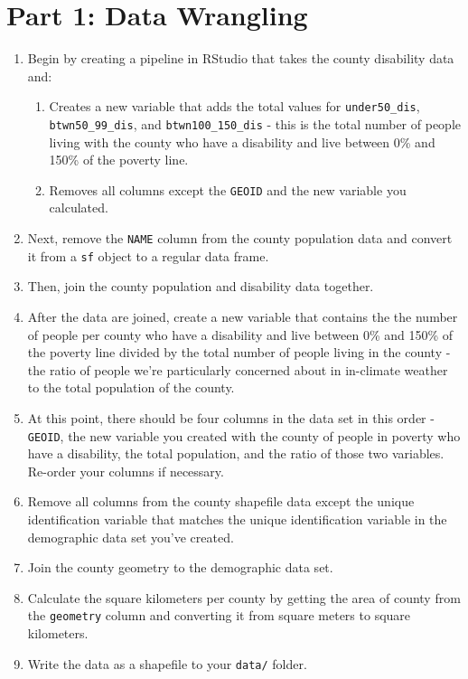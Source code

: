 \documentclass{tufte-handout}
\begin{document}
\section{Part 1: Data Wrangling}
\begin{enumerate}
\item Begin by creating a pipeline in RStudio that takes the county disability data and:
\begin{enumerate}
\item Creates a new variable that adds the total values for \texttt{under50\_dis}, \texttt{btwn50\_99\_dis}, and \texttt{btwn100\_150\_dis} - this is the total number of people living with the county who have a disability and live between 0\% and 150\% of the poverty line.
\item Removes all columns except the \texttt{GEOID} and the new variable you calculated.
\end{enumerate}
\item Next, remove the \texttt{NAME} column from the county population data and convert it from a \texttt{sf} object to a regular data frame.
\item Then, join the county population and disability data together.
\item After the data are joined, create a new variable that contains the the number of people per county who have a disability and live between 0\% and 150\% of the poverty line divided by the total number of people living in the county - the ratio of people we're particularly concerned about in in-climate weather to the total population of the county.
\item At this point, there should be four columns in the data set in this order - \texttt{GEOID}, the new variable you created with the county of people in poverty who have a disability, the total population, and the ratio of those two variables. Re-order your columns if necessary.
\item Remove all columns from the county shapefile data except the unique identification variable that matches the unique identification variable in the demographic data set you've created.
\item Join the county geometry to the demographic data set.
\item Calculate the square kilometers per county by getting the area of county from the \texttt{geometry} column and converting it from square meters to square kilometers.
\item Write the data as a shapefile to your \texttt{data/} folder.
\end{enumerate}
\end{document}
